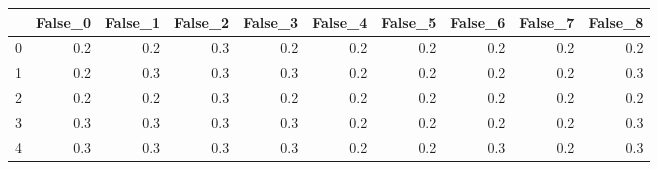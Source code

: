 \begin{tabular}{lrrrrrrrrr}
\toprule
{} &  False\_0 &  False\_1 &  False\_2 &  False\_3 &  False\_4 &  False\_5 &  False\_6 &  False\_7 &  False\_8 \\ \hline
\midrule
0 &      0.2 &      0.2 &      0.3 &      0.2 &      0.2 &      0.2 &      0.2 &      0.2 &      0.2 \\ \hline
1 &      0.2 &      0.3 &      0.3 &      0.3 &      0.2 &      0.2 &      0.2 &      0.2 &      0.3 \\ \hline
2 &      0.2 &      0.2 &      0.3 &      0.2 &      0.2 &      0.2 &      0.2 &      0.2 &      0.2 \\ \hline
3 &      0.3 &      0.3 &      0.3 &      0.3 &      0.2 &      0.2 &      0.2 &      0.2 &      0.3 \\ \hline
4 &      0.3 &      0.3 &      0.3 &      0.3 &      0.2 &      0.2 &      0.3 &      0.2 &      0.3 \\ \hline
\bottomrule
\end{tabular}
